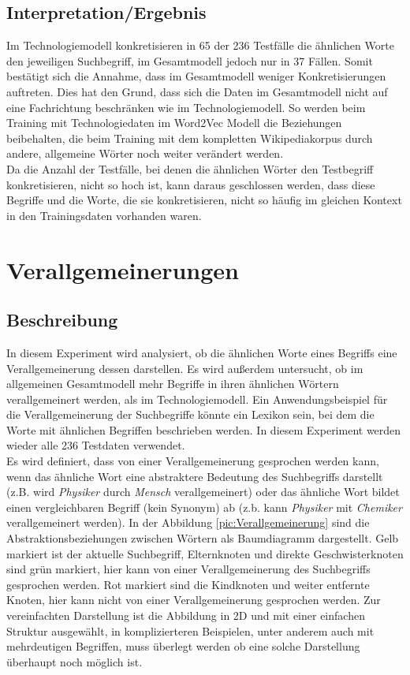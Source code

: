 \documentclass[12pt,a4paper]{report}
\begin{document}
		
		\subsection*{Interpretation/Ergebnis}
Im Technologiemodell konkretisieren in 65 der 236 Testfälle	die ähnlichen Worte den jeweiligen Suchbegriff, im Gesamtmodell jedoch nur in 37 Fällen. Somit bestätigt sich die Annahme, dass im Gesamtmodell weniger Konkretisierungen auftreten. Dies hat den Grund, dass sich die Daten im Gesamtmodell nicht auf eine Fachrichtung beschränken wie im Technologiemodell. So werden beim Training mit Technologiedaten im Word2Vec Modell die Beziehungen beibehalten, die beim Training mit dem kompletten Wikipediakorpus durch andere, allgemeine Wörter noch weiter verändert werden. \\
Da die Anzahl der Testfälle, bei denen die ähnlichen Wörter den Testbegriff konkretisieren, nicht so hoch ist, kann daraus geschlossen werden, dass diese Begriffe und die Worte, die sie konkretisieren, nicht so häufig im gleichen Kontext in den Trainingsdaten vorhanden waren.\\
		
		
	
	\section{Verallgemeinerungen}
		\subsection*{Beschreibung}
		In diesem Experiment wird analysiert, ob die ähnlichen Worte eines Begriffs eine Verallgemeinerung dessen darstellen. Es wird außerdem untersucht, ob im allgemeinen Gesamtmodell mehr Begriffe in ihren ähnlichen Wörtern verallgemeinert werden, als im Technologiemodell. Ein Anwendungsbeispiel für die Verallgemeinerung der Suchbegriffe könnte ein Lexikon sein, bei dem die Worte mit ähnlichen Begriffen beschrieben werden. In diesem Experiment werden wieder alle 236 Testdaten verwendet.\\
		Es wird definiert, dass von einer Verallgemeinerung gesprochen werden kann, wenn das ähnliche Wort eine abstraktere Bedeutung des Suchbegriffs darstellt (z.B. wird \textit{Physiker} durch \textit{Mensch} verallgemeinert) oder das ähnliche Wort bildet einen vergleichbaren Begriff (kein Synonym) ab (z.b. kann \textit{Physiker} mit \textit{Chemiker} verallgemeinert werden). In der Abbildung \ref{pic:Verallgemeinerung} sind die Abstraktionsbeziehungen zwischen Wörtern als Baumdiagramm dargestellt. Gelb markiert ist der aktuelle Suchbegriff, Elternknoten und direkte Geschwisterknoten sind grün markiert, hier kann von einer Verallgemeinerung des Suchbegriffs gesprochen werden. Rot markiert sind die Kindknoten und weiter entfernte Knoten, hier kann nicht von einer Verallgemeinerung gesprochen werden. Zur vereinfachten Darstellung ist die Abbildung in 2D und mit einer einfachen Struktur ausgewählt, in komplizierteren Beispielen, unter anderem auch mit mehrdeutigen Begriffen, muss überlegt werden ob eine solche Darstellung überhaupt noch möglich ist.\\
		
\end{document}
